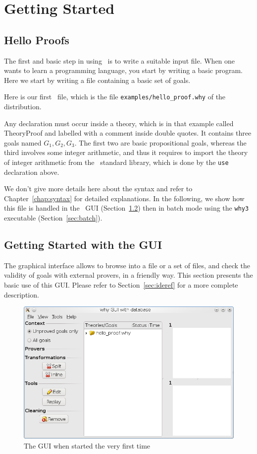 \chapter{Getting Started}
\label{chap:starting}

\section{Hello Proofs}

The first and basic step in using \why\ is to write a suitable input
file. When one wants to learn a programming language, you start by
writing a basic program. Here we start by writing a file containing a
basic set of goals.

Here is our first \why\ file, which is the file
\texttt{examples/hello\_proof.why} of the distribution.


Any declaration must occur
inside a theory, which is in that example called TheoryProof and
labelled with a comment inside double quotes. It contains three goals
named $G_1,G_2,G_3$. The first two are basic propositional goals,
whereas the third involves some integer arithmetic, and thus it
requires to import the theory of integer arithmetic from the \why\
standard library, which is done by the \texttt{use} declaration above.

We don't give more details here about the syntax and refer to
Chapter~\ref{chap:syntax} for detailed explanations. In the following,
we show how this file is handled in the \why\ GUI
(Section~\ref{sec:gui}) then in batch mode using the \texttt{why3}
executable (Section~\ref{sec:batch}).


\section{Getting Started with the GUI}
\label{sec:gui}

The graphical interface allows to browse into a file or a set of
files, and check the validity of goals with external provers, in a
friendly way. This section presents the basic use of this GUI. Please
refer to Section~\ref{sec:ideref} for a more complete description.

\begin{figure}[tbp]
  \includegraphics[width=\textwidth]{gui1.png}
  \caption{The GUI when started the very first time}
  \label{fig:gui1}
\end{figure}


